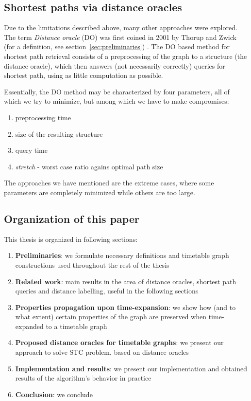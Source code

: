 \documentclass[a4paper]{article}
\begin{document}
        \subsection{Shortest paths via distance oracles}
        Due to the limitations described above, many other approaches were explored. The term \emph{Distance oracle} (DO) was first coined in 2001 by Thorup and Zwick~\cite{apxdo05} (for a definition, see section~\ref{sec:preliminaries}) %
        . The DO based method for shortest path retrieval consists of a preprocessing of the graph to a structure (the distance oracle), which then answers (not necessarily correctly) queries for shortest path, using as little computation as possible.

        Essentially, the DO method may be characterized by four parameters, all of which we try to minimize, but among which we have to make compromises:

        \begin{enumerate}
            \item preprocessing time
            \item size of the resulting structure
            \item query time
            \item \emph{stretch} - worst case ratio agains optimal path size
        \end{enumerate}
        \hspace*{\fill}

        \noindent The approaches we have mentioned are the extreme cases, where some parameters are completely minimized while others are too large.

        \subsection{Organization of this paper}
        This thesis is organized in following sections:

        \begin{enumerate}
            \item \textbf{Preliminaries}: we formulate necessary definitions and timetable graph constructions used throughout the rest of the thesis
            \item \textbf{Related work}: main results in the area of distance oracles, shortest path queries and distance labelling, useful in the following sections
            \item \textbf{Properties propagation upon time-expansion}: we show how (and to what extent) certain properties of the graph are preserved when time-expanded to a timetable graph
            \item \textbf{Proposed distance oracles for timetable graphs}: we present our approach to solve STC problem, based on distance oracles
            \item \textbf{Implementation and results}: we present our implementation and obtained results of the algorithm's behavior in practice
            \item \textbf{Conclusion}: we conclude
        \end{enumerate}
        \hspace*{\fill}
\end{document}
